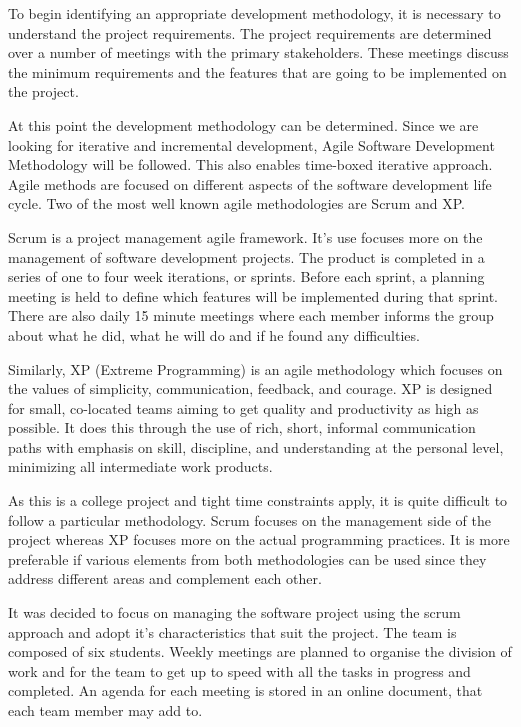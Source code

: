 To begin identifying an appropriate development methodology, it is necessary to understand the project requirements. The project requirements are determined over a number of meetings with the primary stakeholders. These meetings discuss the minimum requirements and the features that are going to be implemented on the project. 

At this point the development methodology can be determined. Since we are looking for iterative and incremental development, Agile Software Development Methodology will be followed. This also enables time-boxed iterative approach. Agile methods are focused on different aspects of the software development life cycle. Two of the most well known agile methodologies are Scrum and XP.

Scrum is a project management agile framework. It’s use focuses more on the management of software development projects. The product is completed in a series of one to four week iterations, or sprints. Before each sprint, a planning meeting is held to define which features will be implemented during that sprint. There are also daily 15 minute meetings where each member informs the group about what he did, what he will do and if he found any difficulties. 

Similarly, XP (Extreme Programming) is an agile methodology which focuses on the values of simplicity, communication, feedback, and courage. XP is designed for small, co-located teams aiming to get quality and productivity as high as possible. It does this through the use of rich, short, informal communication paths with emphasis on skill, discipline, and understanding at the personal level, minimizing all intermediate work products. 

As this is a college project and tight time constraints apply, it is quite
difficult to follow a particular methodology. Scrum focuses on the management
side of the project whereas XP focuses more on the actual programming
practices. It is more preferable if various elements from both methodologies
can be used since they address different areas and complement each other.

It was decided to focus on managing the software project using the scrum
approach and adopt it's characteristics that suit the project. The team is
composed of six students. Weekly meetings are planned to organise the division
of work and for the team to get up to speed with all the tasks in progress and
completed. An agenda for each meeting is stored in an online document, that
each team member may add to. 

